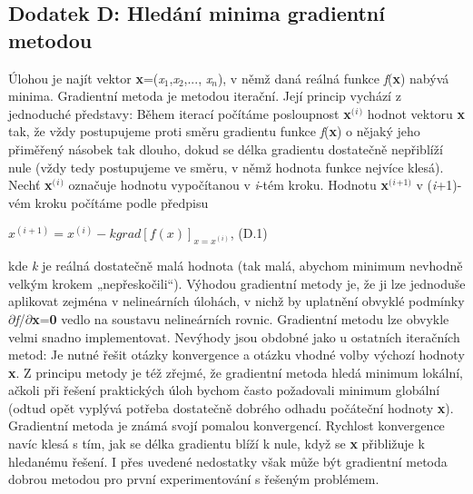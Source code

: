 \noindent 
\subsection{Dodatek D:  Hledání minima gradientní metodou}

\noindent Úlohou je najít vektor \textbf{x}=(\textit{x}${}_{1}$,\textit{x}${}_{2}$,..., \textit{x${}_{n}$}), v němž daná reálná funkce \textit{f}(\textbf{x}) nabývá minima. Gradientní metoda je metodou iterační. Její princip vychází z jednoduché představy: Během iterací počítáme posloupnost \textbf{x}${}^{(}$\textit{${}^{i}$}${}^{)}$ hodnot vektoru \textbf{x} tak, že vždy postupujeme proti směru gradientu funkce \textit{f}(\textbf{x}) o nějaký jeho přiměřený násobek tak dlouho, dokud se délka gradientu dostatečně nepřiblíží nule (vždy tedy postupujeme ve směru, v němž hodnota funkce nejvíce klesá). Nechť \textbf{x}${}^{(}$\textit{${}^{i}$}${}^{)}$ označuje hodnotu vypočítanou v \textit{i}-tém kroku. Hodnotu \textbf{x}${}^{(}$\textit{${}^{i}$}${}^{+1)}$ v (\textit{i}+1)-vém kroku počítáme podle předpisu 

 $x^{(i+1)} =x^{(i)} -kgrad\left[f\left(x\right)\right]_{x=x^{(i)} } $, (D.1)

\noindent kde \textit{k} je reálná dostatečně malá hodnota (tak malá, abychom minimum nevhodně velkým krokem „nepřeskočili``). Výhodou gradientní metody je, že ji lze jednoduše aplikovat zejména v nelineárních úlohách, v nichž by uplatnění obvyklé podmínky $\partial$\textit{f}/$\partial$\textbf{x}=\textbf{0} vedlo na soustavu nelineárních rovnic. Gradientní metodu lze obvykle velmi snadno implementovat. Nevýhody jsou obdobné jako u ostatních iteračních metod: Je nutné řešit otázky konvergence a otázku vhodné volby výchozí hodnoty \textbf{x}. Z principu metody je též zřejmé, že gradientní metoda hledá minimum lokální, ačkoli při řešení praktických úloh bychom často požadovali minimum globální (odtud opět vyplývá potřeba dostatečně dobrého odhadu počáteční hodnoty \textbf{x}). Gradientní metoda je známá svojí pomalou konvergencí. Rychlost konvergence navíc klesá s tím, jak se délka gradientu blíží k nule, když se \textbf{x} přibližuje k hledanému řešení. I přes uvedené nedostatky však může být gradientní metoda dobrou metodou pro první experimentování s řešeným problémem.

